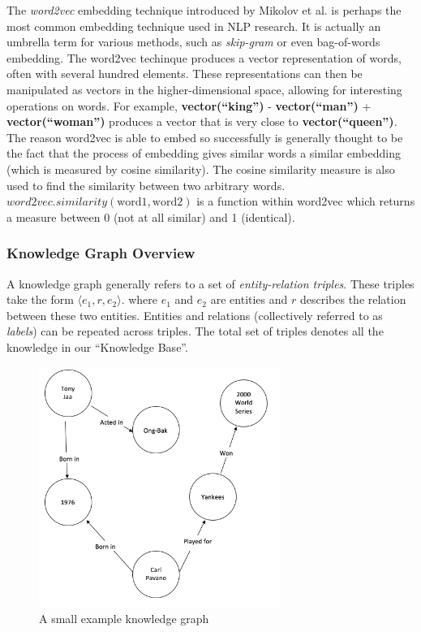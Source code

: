 \documentclass[pageno]{final_paper}
\begin{document}
The \textit{word2vec} embedding technique introduced by Mikolov et al.
\cite{Mikolov2013} is perhaps the most common embedding technique used in NLP
research. It is actually an umbrella term for various methods, such as
\textit{skip-gram} or even bag-of-words embedding. The word2vec techinque
produces a vector representation of words, often with several hundred elements.
These representations can then be manipulated as vectors in the
higher-dimensional space, allowing for interesting operations on words. For
example, \textbf{vector(``king'')} - \textbf{vector(``man'')} +
\textbf{vector(``woman'')} produces a vector that is very close to
\textbf{vector(``queen'')}. The reason word2vec is able to embed so successfully
is generally thought to be the fact that the process of embedding gives similar
words a similar embedding (which is measured by cosine similarity). The cosine
similarity measure is also used to find the similarity between two arbitrary
words. $word2vec.similarity(\text{word1}, \text{word2})$ is a function within
word2vec which returns a measure between 0 (not at all similar) and 1
(identical).

\subsubsection{Knowledge Graph Overview}
\label{Knowledge Graph Overview}

A knowledge graph generally refers to a set of \textit{entity-relation triples}.
These triples take the form $\langle e_1, r, e_2 \rangle$. where $e_1$ and $e_2$
are entities and $r$ describes the relation between these two entities. Entities
and relations (collectively referred to as \textit{labels}) can be repeated
across triples. The total set of triples denotes all the knowledge in our
``Knowledge Base''.

\begin{figure}[!tb]
    \centering
    \includegraphics[width=0.7\textwidth,keepaspectratio]{figures/Example_KG.png}
    \caption{A small example knowledge graph}
    \label{fig: KG}
\end{figure}
\end{document}
